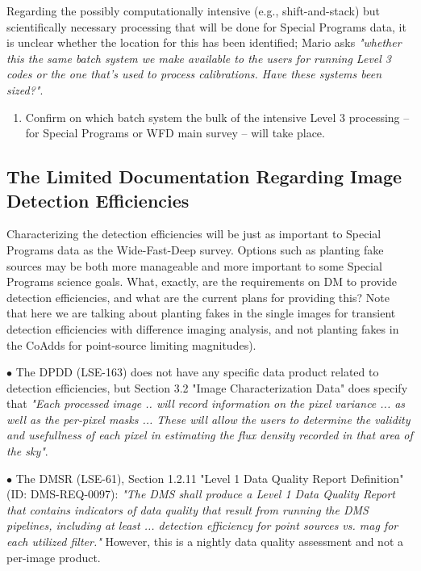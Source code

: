 \documentclass[DM,lsstdraft,toc]{lsstdoc}
\begin{document}
Regarding the possibly computationally intensive (e.g., shift-and-stack) but scientifically necessary processing that will be done for Special Programs data, it is unclear whether the location for this has been identified; Mario asks {\it "whether this the same batch system we make available to the users for running Level 3 codes or the one that's used to process calibrations. Have these systems been sized?"}.
\begin{enumerate}[topsep=-10pt,after=\vspace{10pt},label= \textbf{Concern \Roman*.},resume] \item \label{CS-3} Confirm on which batch system the bulk of the intensive Level 3 processing -- for Special Programs or WFD main survey -- will take place. \end{enumerate}



\subsection{The Limited Documentation Regarding Image Detection Efficiencies}

Characterizing the detection efficiencies will be just as important to Special Programs data as the Wide-Fast-Deep survey. Options such as planting fake sources may be both more manageable and more important to some Special Programs science goals. What, exactly, are the requirements on DM to provide detection efficiencies, and what are the current plans for providing this? Note that here we are talking about planting fakes in the single images for transient detection efficiencies with difference imaging analysis, and not planting fakes in the CoAdds for point-source limiting magnitudes).

$\bullet$ The DPDD (LSE-163) does not have any specific data product related to detection efficiencies, but Section 3.2 "Image Characterization Data" does specify that {\it "Each processed image .. will record information on the pixel variance ... as well as the per-pixel masks ... These will allow the users to determine the validity and usefullness of each pixel in estimating the flux density recorded in that area of the sky"}.

$\bullet$ The DMSR (LSE-61), Section 1.2.11 "Level 1 Data Quality Report Definition" (ID: DMS-REQ-0097): {\it "The DMS shall produce a Level 1 Data Quality Report that contains indicators of data quality that result from running the DMS pipelines, including at least ... detection efficiency for point sources vs. mag for each utilized filter."} However, this is a nightly data quality assessment and not a per-image product. 
\end{document}
